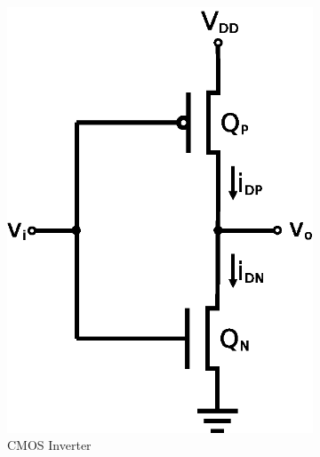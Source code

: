  \begin{figure}[hbtp]
   \centering
   \begin{subfigure}[b]{0.4\textwidth}
     \includegraphics[width=\textwidth]{invert}
     \caption{\label{schem:inverter} CMOS Inverter}
   \end{subfigure}%
   ~
   \begin{subfigure}[b]{0.4\textwidth}

\end{subfigure}
\end{figure}
